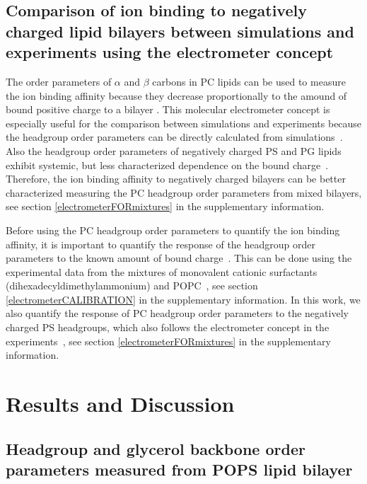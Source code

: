 \documentclass[aps,prl,superscriptaddress,twocolumn]{revtex4}
\begin{document}
\subsection{Comparison of ion binding to negatively charged lipid bilayers 
between simulations and experiments using the electrometer concept}

The order parameters of $\alpha$ and $\beta$ carbons in PC lipids
can be used to measure the ion binding affinity because they 
decrease proportionally to the amound of bound positive
charge to a bilayer \cite{akutsu81,altenbach84,seelig87}.
This molecular electrometer concept is especially useful for 
the comparison between simulations and experiments because
the headgroup order parameters can be directly calculated from 
simulations~\cite{catte16}. Also the headgroup order parameters
of negatively charged PS and PG lipids exhibit systemic, but less
characterized dependence on the bound charge~\cite{borle85,macdonald87,roux86,roux90}.
Therefore, the ion binding affinity to negatively charged bilayers
can be better characterized measuring the PC headgroup order parameters from 
mixed bilayers, see section \ref{electrometerFORmixtures} in the supplementary information.

Before using the PC headgroup order parameters to quantify the ion binding
affinity, it is important to quantify the response of the headgroup order
parameters to the known amount of bound charge~\cite{catte16,melcr18}.
This can be done using the experimental data from the mixtures of
monovalent cationic surfactants (dihexadecyldimethylammonium) and POPC~\cite{scherer89,melcr18},
see section \ref{electrometerCALIBRATION} in the supplementary information.
In this work, we also quantify the response of PC headgroup order parameters
to the negatively charged PS headgroups, which also follows the electrometer
concept in the experiments~\cite{scherer87},
see section \ref{electrometerFORmixtures} in the supplementary information.


\section{Results and Discussion}

\subsection{Headgroup and glycerol backbone order parameters measured from POPS lipid bilayer}
\end{document}
